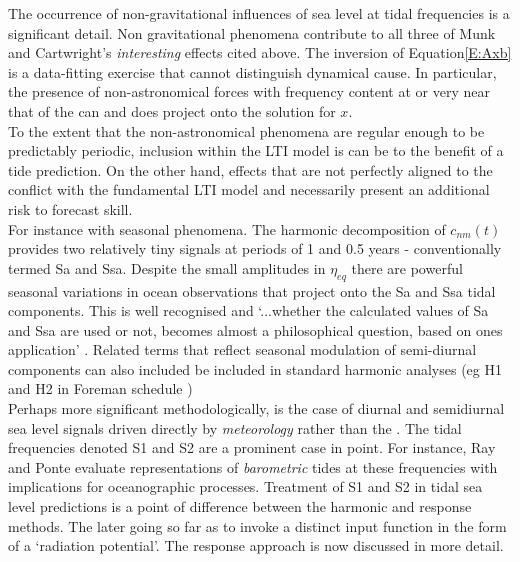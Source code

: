 The occurrence of non-gravitational influences of sea level at tidal frequencies is a significant detail.   Non gravitational phenomena contribute to all three of Munk and Cartwright's \emph{interesting} effects cited above.  The inversion of Equation\ref{E:Axb} is a data-fitting exercise that cannot distinguish dynamical cause.  In particular, the presence of non-astronomical forces with frequency content at or very near that of the \ATGP{} can and does project onto the solution for $x$.\\
To the extent that the non-astronomical phenomena are regular enough to be predictably periodic, inclusion within the LTI model is can be to the benefit of a tide prediction.   On the other hand, effects that are not perfectly aligned to the \ATGF{} conflict with the fundamental LTI model and necessarily present an additional risk to forecast skill.\\
For instance with seasonal phenomena.   The harmonic decomposition of $c_{nm}(t)$ provides two relatively tiny signals at periods of 1 and 0.5 years - conventionally termed Sa and Ssa.  Despite the small amplitudes in $\eta_{eq}$ there are powerful seasonal variations in ocean observations that project onto the Sa and Ssa tidal components.   This is well recognised and `...whether the calculated values of Sa and Ssa are used or not, becomes almost a philosophical question, based on ones application' \citep[p122]{Parker:2007wq}.   Related terms that reflect seasonal modulation of semi-diurnal components can also included be included in standard harmonic analyses (eg H1 and H2 in Foreman schedule \citep{Foreman:1977ua})\\
Perhaps more significant methodologically, is the case of diurnal and semidiurnal sea level signals driven directly by \emph{meteorology} rather than the \ATGP{}.   The tidal frequencies denoted S1 and S2 are a prominent case in point.  For instance, Ray and Ponte \citep{Ray:2003ui} evaluate \NWP{} representations of \emph{barometric} tides at these frequencies with implications for oceanographic processes.  Treatment of S1 and S2 in tidal sea level predictions is a point of difference between the harmonic and response methods.  The later going so far as to invoke a distinct input function in the form of a `radiation potential'.    The response approach is now discussed in more detail. 






